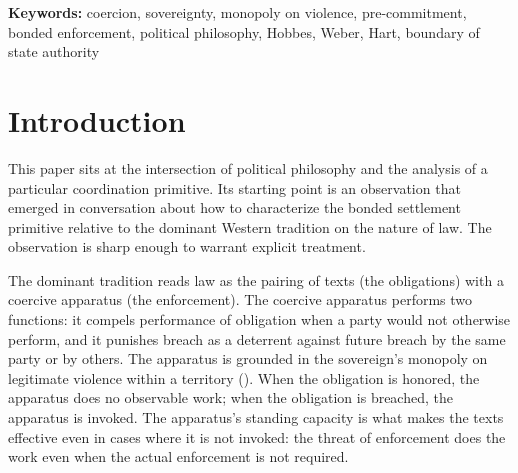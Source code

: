 \documentclass[11pt,a4paper]{article}
\theoremstyle{remark}
\begin{document}
\begin{abstract}
The substantive claim of this paper is therefore not that the
sovereign is unnecessary or that the state should be reduced. It
is that the political-philosophical question of legitimate
coercion --- which thinkers from Hobbes to Schmitt have addressed
as if it ranged over the entirety of social cooperation ---
becomes a bounded question once a substantial part of bilateral
commerce can be coordinated by pre-commitment rather than by
sovereign-backed coercion. The state retains its load-bearing
functions; the question of how it should exercise them retains
its political-philosophical urgency; what changes is the
\emph{domain} over which the question must be answered. This
relocation is the political-philosophical content of the
substrate change, and it is the subject of this paper.
\end{abstract}

\medskip
\noindent\textbf{Keywords:}
coercion, sovereignty, monopoly on violence, pre-commitment,
bonded enforcement, political philosophy, Hobbes, Weber, Hart,
boundary of state authority

\section{Introduction}
\label{sec:intro}

This paper sits at the intersection of political philosophy and
the analysis of a particular coordination primitive. Its
starting point is an observation that emerged in conversation
about how to characterize the bonded settlement primitive
relative to the dominant Western tradition on the nature of law.
The observation is sharp enough to warrant explicit treatment.

The dominant tradition reads law as the pairing of texts (the
obligations) with a coercive apparatus (the enforcement). The
coercive apparatus performs two functions: it compels performance
of obligation when a party would not otherwise perform, and it
punishes breach as a deterrent against future breach by the same
party or by others. The apparatus is grounded in the sovereign's
monopoly on legitimate violence within a territory
(\citealt{weber1919}). When the obligation is honored, the
apparatus does no observable work; when the obligation is
breached, the apparatus is invoked. The apparatus's standing
capacity is what makes the texts effective even in cases where
it is not invoked: the threat of enforcement does the work even
when the actual enforcement is not required.
\end{document}
